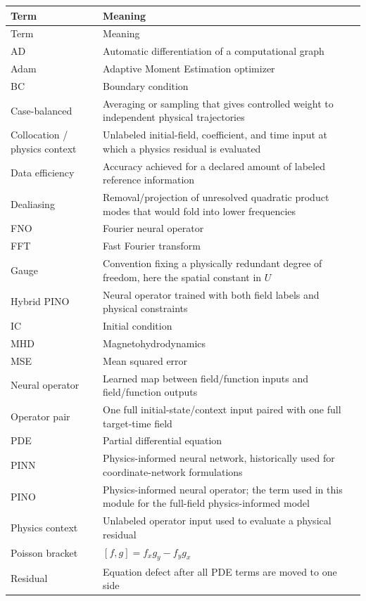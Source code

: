 \documentclass[11pt]{article}
\begin{document}
\begin{longtable}{p{}p{}}
\toprule
Term & Meaning \\
\midrule
\endfirsthead
\toprule
Term & Meaning \\
\midrule
\endhead
AD & Automatic differentiation of a computational graph \\
Adam & Adaptive Moment Estimation optimizer \\
BC & Boundary condition \\
Case-balanced & Averaging or sampling that gives controlled weight to independent physical trajectories \\
Collocation / physics context & Unlabeled initial-field, coefficient, and time input at which a physics residual is evaluated \\
Data efficiency & Accuracy achieved for a declared amount of labeled reference information \\
Dealiasing & Removal/projection of unresolved quadratic product modes that would fold into lower frequencies \\
FNO & Fourier neural operator \\
FFT & Fast Fourier transform \\
Gauge & Convention fixing a physically redundant degree of freedom, here the spatial constant in $U$ \\
Hybrid PINO & Neural operator trained with both field labels and physical constraints \\
IC & Initial condition \\
MHD & Magnetohydrodynamics \\
MSE & Mean squared error \\
Neural operator & Learned map between field/function inputs and field/function outputs \\
Operator pair & One full initial-state/context input paired with one full target-time field \\
PDE & Partial differential equation \\
PINN & Physics-informed neural network, historically used for coordinate-network formulations \\
PINO & Physics-informed neural operator; the term used in this module for the full-field physics-informed model \\
Physics context & Unlabeled operator input used to evaluate a physical residual \\
Poisson bracket & $[f,g]=f_xg_y-f_yg_x$ \\
Residual & Equation defect after all PDE terms are moved to one side \\

\end{longtable}
\end{document}
